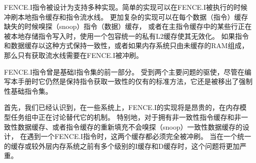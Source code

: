 \begin{commentary}
FENCE.I指令被设计为支持多种实现。简单的实现可以在FENCE.I被执行的时候冲刷本地指令缓存和指令流水线。
更加复杂的实现可以在每个数据（指令）缓存缺失的时候嗅探（snoop）指令（数据）缓存，
或者在主指令缓存中的某些行正在被本地存储指令写入时，使用一个包容统一的私有L2缓存使其无效化。
如果指令和数据缓存以这种方式保持一致性，或者如果内存系统只由未缓存的RAM组成，那么只有获取流水线需要在FENCE.I被冲刷。

FENCE.I指令曾是基础I指令集的前一部分。
受到两个主要问题的驱使，尽管在编写本手册时它仍然是保持指令获取一致性的仅有的标准方法，它还是被移出了强制性基础指令集。

首先，我们已经认识到，在一些系统上，FENCE.I的实现将是昂贵的，在内存模型任务组中正在讨论替代它的机制。
特别地，对于拥有非一致性指令缓存和非一致性数据缓存、或者指令缓存的重新填充不会嗅探（snoop）一致性数据缓存的设计，
在遇到一个FENCE.I指令时，这两个缓存都必须完全被冲刷。
当在一个统一的缓存或较外层内存系统之前有多个级别的I缓存和D缓存时，这个问题将更加严重。


\end{commentary}
